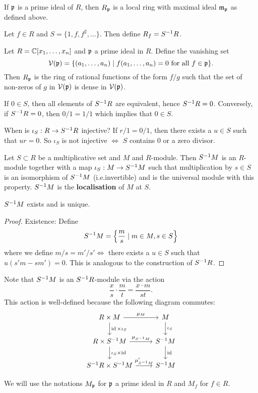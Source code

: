 \begin{prop}
  If $\mathfrak{p}$ is a prime ideal of $R$, then $R_{\mathfrak{p}}$ is a local ring with maximal ideal $\mathfrak{m}_{\mathfrak{p}}$ as defined above.
\end{prop}

\begin{exam}
  \leavevmode
  \begin{enum}
    \io
    Let $f \in R$ and $S = \{1,f,f^2,\ldots\}$.
    Then define $R_f = S^{-1} R$.

    \io
    Let $R = \mathbb{C}[x_1,\ldots,x_n]$ and $\mathfrak{p}$ a prime ideal in $R$.
    Define the vanishing set
    \[\mathcal{V}(\mathfrak{p}) = \{(a_1,\ldots,a_n) \mid f(a_1,\ldots,a_n)=0 \text{ for all } f \in \mathfrak{p}\}.\]
    Then $R_{\mathfrak{p}}$ is the ring of rational functions of the form $f/g$ such that the set of non-zeros of $g$ in $\mathcal{V}(\mathfrak{p})$ is dense in $\mathcal{V}(\mathfrak{p})$.

    \io
    If $0 \in S$, then all elements of $S^{-1} R$ are equivalent, hence $S^{-1} R = 0$.
    Conversely, if $S^{-1} R=0$, then $0/1=1/1$ which implies that $0 \in S$.

    \io
    When is $\iota_S: R \to S^{-1} R$ injective?
    If $r/1=0/1$, then there exists a $u \in S$ such that $ur=0$.
    So $\iota_S$ is not injective $\iff$ $S$ contains $0$ or a zero divisor.
  \end{enum}
\end{exam}

\begin{defn}[2.4]
  Let $S \subset R$ be a multiplicative set and $M$ and $R$-module.
  Then $S^{-1} M$ is an $R$-module together with a map $\iota_S: M \to S^{-1} M$ such that multiplication by $s \in S$ is an isomorphism of $S^{-1} M$ (i.e.\@ invertible) and is the universal module with this property.
  $S^{-1} M$ is the \textbf{localisation} of $M$ at $S$.
\end{defn}

\begin{prop}[2.5]
  $S^{-1} M$ exists and is unique.
\end{prop}

\begin{proof}
  Existence:
  Define
  \[S^{-1} M = \left\{ \frac{m}{s} \mid m \in M, s \in S \right\}\]
  where we define $m/s=m'/s' \iff$ there exists a $u \in S$ such that $u(s'm-sm')=0$.
  This is analogous to the construction of $S^{-1} R$.
\end{proof}

\begin{rmk}
  Note that $S^{-1} M$ is an $S^{-1} R$-module via the action
  \[\frac{x}{s} \cdot \frac{m}{t} = \frac{x \cdot m}{st}.\]
  This action is well-defined because the following diagram commutes:
  \begin{equation*}
    \begin{tikzcd}
      R \times M \ar[r, "\mu_M"] \ar[d, "\id \times \iota_S"] & M \ar[d, "\iota_S"] \\
      R \times S\inv M \ar[r, "\mu_{S\inv M}"] \ar[d, "\iota_S \times \id"] & S\inv M \ar[d, "\id"] \\
      S\inv R \times S\inv M \ar[r, "\mu_{S\inv M}'"] & S\inv M
    \end{tikzcd}
  \end{equation*}
\end{rmk}

\begin{rmk}
  We will use the notations $M_{\mathfrak{p}}$ for $\mathfrak{p}$ a prime ideal in $R$ and $M_f$ for $f \in R$.
\end{rmk}
